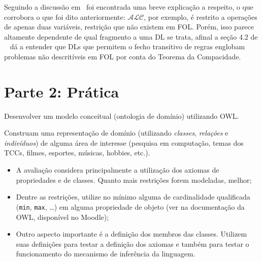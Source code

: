 \documentclass[answers]{exam}
\begin{document}
\begin{questions}
\begin{answer}
            Seguindo a discussão em~\cite{emails} foi encontrada uma breve
            explicação a respeito, o que corrobora o que foi dito
            anteriormente: $\mathcal{ALC}$, por exemplo, é restrito a operações
            de apenas duas variáveis, restrição que não existem em FOL\@.
            Porém, isso parece altamente dependente de qual fragmento a uma DL
            se trata, afinal a seção 4.2 de ~\cite{handbook} dá a entender que
            DLs que permitem o fecho transitivo de regras englobam problemas
            não descritíveis em FOL por conta do Teorema da Compacidade.
        \end{answer}
    \end{questions}

    \clearpage{}

    \section{Parte 2: Prática}
    \begin{questions}
        \question{}
        Desenvolver um modelo conceitual (ontologia de domínio) utilizando
        OWL\@.

        Construam uma representação de domínio (utilizando \emph{classes},
        \emph{relações} e \emph{indivíduos}) de alguma área de interesse
        (pesquisa em computação, temas dos TCCs, filmes, esportes, músicas,
        hobbies, etc.).

        \begin{superframe}
            \begin{itemize}
                \item A avaliação considera principalmente a utilização dos
                    axiomas de propriedades e de classes. Quanto mais
                    restrições forem modeladas, melhor;

                \item Dentre as restrições, utilize no mínimo alguma de
                    cardinalidade qualificada (\texttt{min}, \texttt{max},
                    \ldots) em alguma propriedade de objeto (ver na
                    documentação da OWL, disponível no Moodle);

                \item Outro aspecto importante é a definição dos membros das
                    classes. Utilizem suas definições para testar a definição
                    dos axiomas e também para testar o funcionamento do
                    mecanismo de inferência da linguagem.
            \end{itemize}
        \end{superframe}
    \end{questions}

    
    
    \nocite{*}
\end{document}
